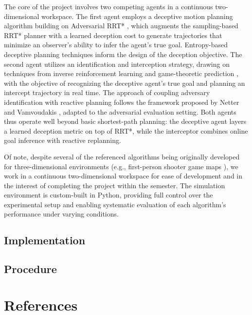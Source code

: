 \documentclass[letterpaper, 10pt, conference]{ieeeconf}
\begin{document}
The core of the project involves two competing agents in a continuous two-dimensional workspace. The first agent employs a deceptive motion planning algorithm building on Adversarial RRT* \cite{nichols2022adversarial}, which augments the sampling-based RRT* planner with a learned deception cost to generate trajectories that minimize an observer's ability to infer the agent's true goal. Entropy-based deceptive planning techniques \cite{xu2020single, xu2019goal} inform the design of the deception objective. The second agent utilizes an identification and interception strategy, drawing on techniques from inverse reinforcement learning and game-theoretic prediction \cite{zeng2023recognition, tastan2012learning, lecleach2021lucidgames}, with the objective of recognizing the deceptive agent's true goal and planning an intercept trajectory in real time. The approach of coupling adversary identification with reactive planning follows the framework proposed by Netter and Vamvoudakis \cite{netter2024motion}, adapted to the adversarial evaluation setting. Both agents thus operate well beyond basic shortest-path planning: the deceptive agent layers a learned deception metric on top of RRT*, while the interceptor combines online goal inference with reactive replanning.

Of note, despite several of the referenced algorithms being originally developed for three-dimensional environments (e.g., first-person shooter game maps \cite{tastan2012learning}), we work in a continuous two-dimensional workspace for ease of development and in the interest of completing the project within the semester. The simulation environment is custom-built in Python, providing full control over the experimental setup and enabling systematic evaluation of each algorithm's performance under varying conditions.

\subsection{Implementation} \label{sec:methodology/implementation}

\lipsum[1-2]

\subsection{Procedure} \label{sec:methodology/procedure}

\lipsum[1-2]

\section*{References} \label{sec:references}

\printbibliography[heading = none]
\end{document}
